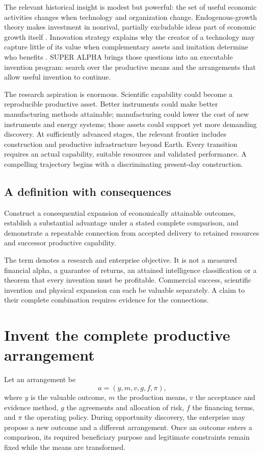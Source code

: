 \documentclass[11pt,letterpaper]{article}
\begin{document}
The relevant historical insight is modest but powerful: the set of useful economic activities changes when technology and organization change. Endogenous-growth theory makes investment in nonrival, partially excludable ideas part of economic growth itself \cite{romer}. Innovation strategy explains why the creator of a technology may capture little of its value when complementary assets and imitation determine who benefits \cite{teece}. SUPER ALPHA brings those questions into an executable invention program: search over the productive means and the arrangements that allow useful invention to continue.

The research aspiration is enormous. Scientific capability could become a reproducible productive asset. Better instruments could make better manufacturing methods attainable; manufacturing could lower the cost of new instruments and energy systems; those assets could support yet more demanding discovery. At sufficiently advanced stages, the relevant frontier includes construction and productive infrastructure beyond Earth. Every transition requires an actual capability, suitable resources and validated performance. A compelling trajectory begins with a discriminating present-day construction.

\subsection{A definition with consequences}
\begin{definition}
Construct a consequential expansion of economically attainable outcomes, establish a substantial advantage under a stated complete comparison, and demonstrate a repeatable connection from accepted delivery to retained resources and successor productive capability.
\end{definition}
The term denotes a research and enterprise objective. It is not a measured financial alpha, a guarantee of returns, an attained intelligence classification or a theorem that every invention must be profitable. Commercial success, scientific invention and physical expansion can each be valuable separately. A claim to their complete combination requires evidence for the connections.

\section{Invent the complete productive arrangement}
Let an arrangement be
\begin{equation}
a=(y,m,v,g,f,\pi),
\end{equation}
where $y$ is the valuable outcome, $m$ the production means, $v$ the acceptance and evidence method, $g$ the agreements and allocation of risk, $f$ the financing terms, and $\pi$ the operating policy. During opportunity discovery, the enterprise may propose a new outcome and a different arrangement. Once an outcome enters a comparison, its required beneficiary purpose and legitimate constraints remain fixed while the means are transformed.
\end{document}
